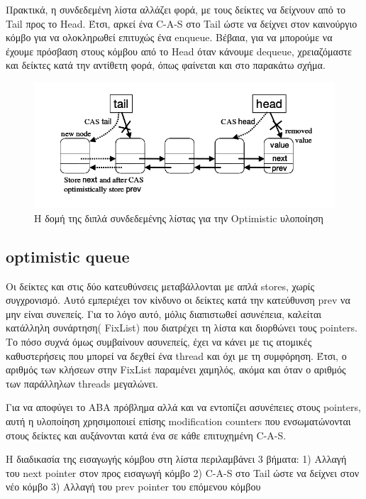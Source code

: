 Πρακτικά, η συνδεδεμένη λίστα αλλάζει φορά, με τους δείκτες να δείχνουν από το Tail προς το Head. Έτσι, αρκεί ένα C-A-S στο Tail ώστε να δείχνει στον καινούργιο κόμβο για να ολοκληρωθεί επιτυχώς ένα enqueue. Βέβαια, για να μπορούμε να έχουμε πρόσβαση στους κόμβου από το Head όταν κάνουμε dequeue, χρειαζόμαστε και δείκτες κατά την αντίθετη φορά, όπως φαίνεται και στο παρακάτω σχήμα.

\begin{figure}
 \centering
  \includegraphics[scale=0.6]{optimistic_struct.png}
 \caption{ Η δομή της διπλά συνδεδεμένης λίστας για την \textlatin{Optimistic} υλοποίηση}
\end{figure}

\subsection{\textlatin{optimistic queue}}

Οι δείκτες και στις δύο κατευθύνσεις μεταβάλλονται με απλά \textlatin{stores}, χωρίς συγχρονισμό. Αυτό εμπεριέχει τον κίνδυνο οι δείκτες κατά την κατεύθυνση \textlatin{prev} να μην είναι συνεπείς. Για το λόγο αυτό, μόλις διαπιστωθεί ασυνέπεια, καλείται κατάλληλη συνάρτηση( \textlatin{FixList}) που διατρέχει τη λίστα και διορθώνει τους \textlatin{pointers}. Το πόσο συχνά όμως συμβαίνουν ασυνεπείς, έχει να κάνει με τις ατομικές καθυστερήσεις που μπορεί να δεχθεί ένα \textlatin{thread} και όχι με τη συμφόρηση. Έτσι, ο αριθμός των κλήσεων στην \textlatin{FixList} παραμένει χαμηλός, ακόμα και όταν ο αριθμός των παράλληλων \textlatin{threads} μεγαλώνει.

Για να αποφύγει το ABA πρόβλημα αλλά και να εντοπίζει ασυνέπειες στους pointers, αυτή η υλοποίηση χρησιμοποιεί επίσης \textlatin{modification counters} που ενσωματώνονται στους δείκτες και αυξάνονται κατά ένα σε κάθε επιτυχημένη \textlatin{C-A-S}.

H διαδικασία της εισαγωγής κόμβου στη λίστα περιλαμβάνει 3 βήματα:
1) Αλλαγή του \textlatin{next pointer} στον προς εισαγωγή κόμβο
2) \textlatin{C-A-S} στο \textlatin{Tail} ώστε να δείχνει στον νέο κόμβο
3) Αλλαγή του \textlatin{prev pointer} του επόμενου κόμβου

